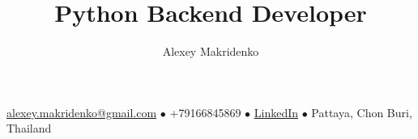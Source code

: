 \documentclass[a4paper,12pt]{article} \raggedright
\makeatletter
\renewcommand{\maketitle}{
    {\Large\bfseries\theauthor}
    \vspace{.35em}

    {\bfseries\thetitle}

    \vspace{.25em}

    \underline{alexey.makridenko@gmail.com} {\scriptsize$\bullet$}
    +79166845869 {\scriptsize$\bullet$}
    \href{https://www.linkedin.com/in/makridenko/}{\underline{LinkedIn}} {\scriptsize$\bullet$}
    Pattaya, Chon Buri, Thailand
}
\makeatother
\begin{document}
\author{Alexey Makridenko}
\title{Python Backend Developer}
\maketitle






\end{document}
